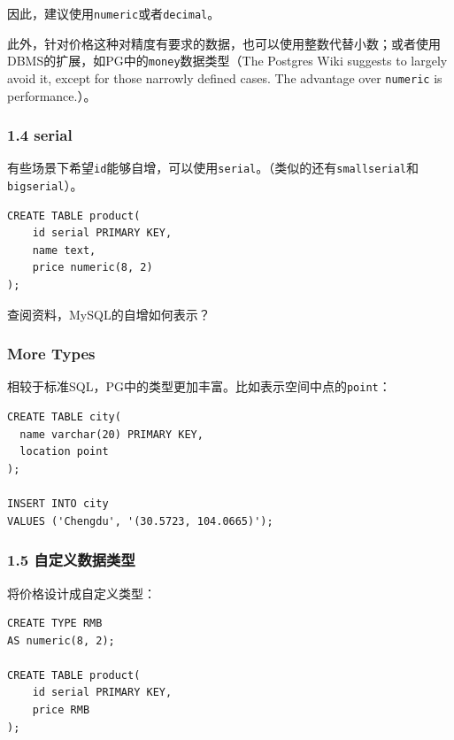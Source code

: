 \documentclass[aspectratio=169, 14pt]{beamer}
\begin{document}
\begin{frame}
因此，建议使用\texttt{numeric}或者\texttt{decimal}。


此外，针对价格这种对精度有要求的数据，也可以使用整数代替小数；或者使用DBMS的扩展，如PG中的\texttt{money}数据类型（The Postgres Wiki suggests to largely avoid it, except for those narrowly defined cases. The advantage over \texttt{numeric} is performance.）。
\end{frame}

\begin{frame}[fragile]
    \frametitle{1.4 serial}
有些场景下希望\texttt{id}能够自增，可以使用\texttt{serial}。（类似的还有\texttt{smallserial}和\texttt{bigserial}）。

\begin{verbatim}
CREATE TABLE product(
    id serial PRIMARY KEY,
    name text,
    price numeric(8, 2)
);
\end{verbatim}

 查阅资料，MySQL的自增如何表示？

\end{frame}

\begin{frame}[fragile]
    \frametitle{More Types}

相较于标准SQL，PG中的类型更加丰富。比如表示空间中点的\texttt{point}：

\begin{verbatim}
CREATE TABLE city(
  name varchar(20) PRIMARY KEY,
  location point
);

INSERT INTO city
VALUES ('Chengdu', '(30.5723, 104.0665)');
\end{verbatim}

\end{frame}

\begin{frame}[fragile]
    \frametitle{1.5 自定义数据类型}
将价格设计成自定义类型：

\begin{verbatim}
CREATE TYPE RMB
AS numeric(8, 2);

CREATE TABLE product(
    id serial PRIMARY KEY,
    price RMB
);
\end{verbatim}

\end{frame}
\end{document}
